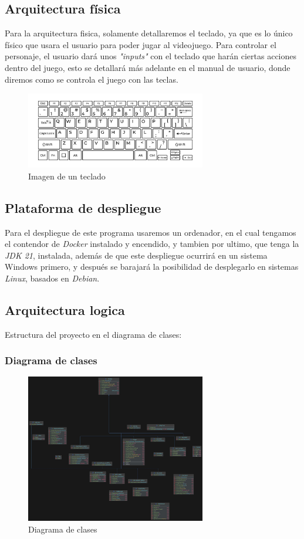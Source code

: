 \documentclass[a4paper]{article}
\begin{document}
\subsection{Arquitectura física}
Para la arquitectura fisica, solamente detallaremos el teclado, ya que es lo único físico que usara el usuario para poder jugar al videojuego.
Para controlar el personaje, el usuario dará unos \textit{"inputs"} con el teclado que harán ciertas acciones dentro del juego, esto se detallará más
adelante en el manual de usuario, donde diremos como se controla el juego con las teclas.
\begin{figure}[ht]
    \centering
    \includegraphics[width=0.7\textwidth]{Images/teclado.jpg}
    \caption{Imagen de un teclado}
    \label{fig:teclado}
\end{figure}
\subsection{Plataforma de despliegue}
Para el despliegue de este programa usaremos un ordenador, en el cual tengamos el contendor de \textit{Docker} instalado y encendido, y tambien por ultimo, que tenga la \textit{JDK 21}, instalada, además de que este
despliegue ocurrirá en un sistema Windows primero, y después se barajará la posibilidad de desplegarlo en sistemas \textit{Linux}, basados en \textit{Debian}.
\clearpage
\subsection{Arquitectura logica}
Estructura del proyecto en el diagrama de clases:
\subsubsection{Diagrama de clases}
\begin{figure}[ht]
    \centering
    \includegraphics[width=0.7\textwidth]{Images/diagrama.jpg}
    \caption{Diagrama de clases}
    \label{fig:diagrama-clases}
\end{figure}
\end{document}
